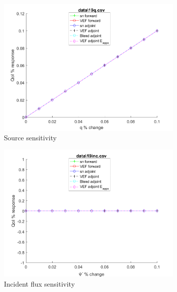 \documentclass{article}
\begin{document}
\begin{figure}[H]
\label{InHomoPertq}
\centering
\begin{subfigure}{.5\textwidth}
  \centering
  \includegraphics[width=.98\linewidth]{IanProposal/figures2/19qSens.png}
  \caption{Source sensitivity}
  \label{fig:sfig1}
\end{subfigure}%
\begin{subfigure}{.5\textwidth}
  \centering
  \includegraphics[width=.98\linewidth]{IanProposal/figures2/19incSens.png}
  \caption{Incident flux sensitivity}
  \label{fig:sfig4}
\end{subfigure}%
\\
\begin{subfigure}{.5\textwidth}
  \centering

\end{subfigure}
\end{figure}
\end{document}
